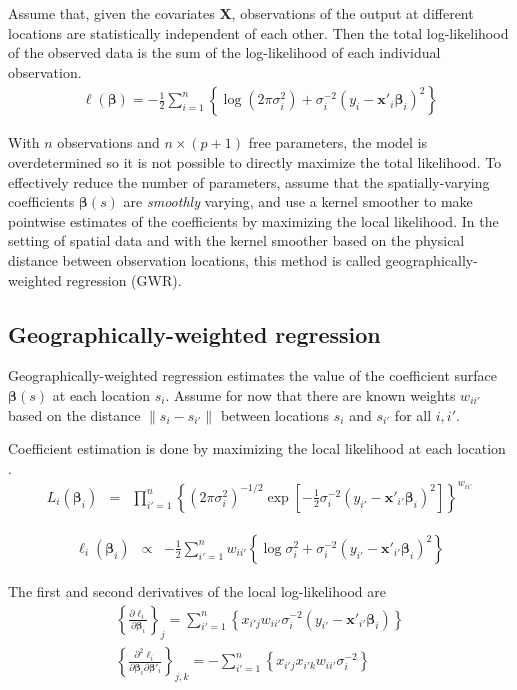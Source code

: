 \documentclass[authoryear, review, 11pt]{elsarticle}
\begin{document}
	Assume that, given the covariates $\bm{X}$, observations of the output at different locations are statistically independent of each other. Then the total log-likelihood of the observed data is the sum of the log-likelihood of each individual observation.
	 \begin{eqnarray}
	 	\ell\left( \bm{\beta} \right) = - \frac{1}{2} \sum_{i=1}^n \left\{  \log \left( 2 \pi \sigma^2_i\right) +  \sigma^{-2}_i  \left(y_i - \bm{x}'_i\bm{\beta}_i \right)^2  \right\}
	\end{eqnarray}
	
	With $n$ observations and $n \times (p+1)$ free parameters, the model is overdetermined so it is not possible to directly maximize the total likelihood. To effectively reduce the number of parameters, assume that the spatially-varying coefficients $\bm{\beta}(s)$ are \emph{smoothly} varying, and use a kernel smoother to make pointwise estimates of the coefficients by maximizing the local likelihood. In the setting of spatial data and with the kernel smoother based on the physical distance between observation locations, this method is called geographically-weighted regression (GWR).
		
	\subsection{Geographically-weighted regression}
	Geographically-weighted regression estimates the value of the coefficient surface $\bm{\beta}(s)$ at each location $s_i$. Assume for now that there are known weights $w_{ii'}$ based on the distance $\|s_i  -s_{i'}\|$ between locations $s_i$ and $s_{i'}$ for all $i, i'$.
	
	Coefficient estimation is done by maximizing the local likelihood at each location \citep{Fotheringham:2002}.	
	\begin{eqnarray}
		L_i\left(\bm{\beta}_i\right) &=& \prod_{i'=1}^n \left\{ \left(2 \pi \sigma^2_i  \right)^{-1/2}  \exp\left[-\frac{1}{2} \sigma^{-2}_i  \left(y_{i'} - \bm{x}'_{i'} \bm{\beta}_i \right)^2 \right] \right\} ^ {w_{ii'}}
	\end{eqnarray}
			
	\begin{eqnarray}
		\ell_i\left(\bm{\beta}_i\right) &\propto& - \frac{1}{2} \sum_{i'=1}^n w_{ii'} \left\{ \log{\sigma^2_i}  + \sigma^{-2}_i  \left(y_{i'} - \bm{x}'_{i'} \bm{\beta}_i \right)^2 \right\}
	\end{eqnarray}
	
	The first and second derivatives of the local log-likelihood are
	\begin{eqnarray}
		\left\{\frac{\partial \ell_i}{\partial \bm{\beta}_i} \right\}_j =   \sum_{i'=1}^n \left\{ x_{i'j} w_{ii'} \sigma^{-2}_i \left( y_{i'} - \bm{x}'_{i'} \bm{\beta}_i \right) \right\} \\
		\left\{\frac{\partial^2 \ell_i}{\partial \bm{\beta}_i \partial \bm{\beta}'_i} \right\}_{j,k} = -\sum_{i'=1}^n \left\{ x_{i'j} x_{i'k} w_{ii'} \sigma^{-2}_i \right\}
	\end{eqnarray}
	
\end{document}
